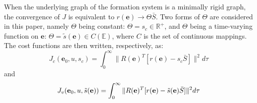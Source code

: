\documentclass[times]{rncauth}
\newcommand{\be}{\ensuremath \mathbf{e}}
\begin{document}
 When the
underlying graph of the formation system
 is a minimally rigid graph, the convergence of $J$ is equivalent
to $r(\mathbf{e})\rightarrow \Theta \bar{S}$. Two forms of $\Theta$
are considered in this paper, namely $\Theta$ being constant:
$\Theta=s_c\in\mathbb{R}^+$, and $\Theta$ being a time-varying
function on $\mathbf{e}$: $\Theta=\tilde{s}(\mathbf{e})\in
C(\mathbb{E})$, where $C$ is the set of continuous mappings. The cost
functions are then written, respectively, as:
\begin{equation}\label{eq:jc}
  J_c(\mathbf{e}_0,u,s_c)=\int^\infty_0 \|R(\mathbf{e})^T[r(\mathbf{e})-s_c\bar{S}]\|^2 d\tau
  \end{equation}
  and
\begin{equation}\label{eq:myJ}
  J_v(\mathbf{e}_0,u,\tilde{s}(\be))=\int^\infty_0 \|R(\mathbf{e})^T[r(\mathbf{e})-\tilde{s}(\mathbf{e})\bar{S}]\|^2 d\tau
\end{equation}
\end{document}
